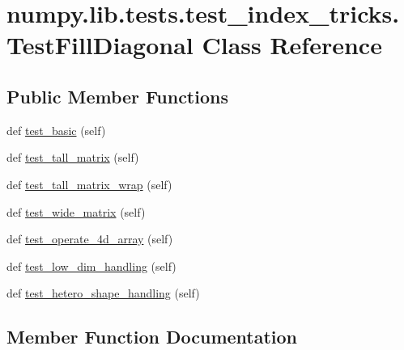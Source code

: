 \hypertarget{classnumpy_1_1lib_1_1tests_1_1test__index__tricks_1_1TestFillDiagonal}{}\section{numpy.\+lib.\+tests.\+test\+\_\+index\+\_\+tricks.\+Test\+Fill\+Diagonal Class Reference}
\label{classnumpy_1_1lib_1_1tests_1_1test__index__tricks_1_1TestFillDiagonal}
\subsection*{Public Member Functions}
\begin{DoxyCompactItemize}
\item 
def \hyperlink{classnumpy_1_1lib_1_1tests_1_1test__index__tricks_1_1TestFillDiagonal_a26dd75c9c2dd538d5367440b16c3b551}{test\+\_\+basic} (self)
\item 
def \hyperlink{classnumpy_1_1lib_1_1tests_1_1test__index__tricks_1_1TestFillDiagonal_a25c51b80c063c21e7ec7b704f260b2d5}{test\+\_\+tall\+\_\+matrix} (self)
\item 
def \hyperlink{classnumpy_1_1lib_1_1tests_1_1test__index__tricks_1_1TestFillDiagonal_a40d220e18cbf79f37011e51fbeea461b}{test\+\_\+tall\+\_\+matrix\+\_\+wrap} (self)
\item 
def \hyperlink{classnumpy_1_1lib_1_1tests_1_1test__index__tricks_1_1TestFillDiagonal_ab835d8f15817e5b5c82564ae78c30afc}{test\+\_\+wide\+\_\+matrix} (self)
\item 
def \hyperlink{classnumpy_1_1lib_1_1tests_1_1test__index__tricks_1_1TestFillDiagonal_a7355041a616a462d6fdca392a3bc3a40}{test\+\_\+operate\+\_\+4d\+\_\+array} (self)
\item 
def \hyperlink{classnumpy_1_1lib_1_1tests_1_1test__index__tricks_1_1TestFillDiagonal_ae3288df582371192428c9b0187d0fcc4}{test\+\_\+low\+\_\+dim\+\_\+handling} (self)
\item 
def \hyperlink{classnumpy_1_1lib_1_1tests_1_1test__index__tricks_1_1TestFillDiagonal_a17c424af6329f570ce07e5693c62e438}{test\+\_\+hetero\+\_\+shape\+\_\+handling} (self)
\end{DoxyCompactItemize}


\subsection{Member Function Documentation}
\mbox{\label{classnumpy_1_1lib_1_1tests_1_1test__index__tricks_1_1TestFillDiagonal_a26dd75c9c2dd538d5367440b16c3b551}} 
